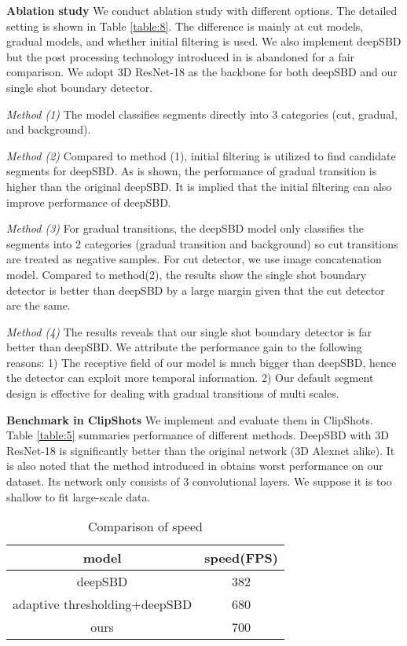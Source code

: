 \documentclass[runningheads]{llncs}
\begin{document}
\textbf{Ablation study} We conduct ablation study with different options. The detailed setting is shown in Table \ref{table:8}. The difference is mainly at cut models, gradual models, and whether initial filtering is used. We also implement deepSBD but the post processing technology introduced in \cite{hassanien2017large} is abandoned for a fair comparison. We adopt 3D ResNet-18 as the backbone for both deepSBD and our single shot boundary detector. 

\textit{Method (1)} The model classifies segments directly into 3 categories (cut, gradual, and background).

\textit{Method (2)} Compared to method (1), initial filtering is utilized to find candidate segments for deepSBD. As is shown, the performance of gradual transition is higher than the original deepSBD. It is implied that the initial filtering can also improve performance of deepSBD.

\textit{Method (3)} For gradual transitions, the deepSBD model only classifies the segments into 2 categories (gradual transition and background) so cut transitions are treated as negative samples. For cut detector, we use image concatenation model. Compared to method(2), the results show the single shot boundary detector is better than deepSBD by a large margin given that the cut detector are the same.

\textit{Method (4)} The results reveals that our single shot boundary detector is far better than deepSBD. We attribute the performance gain to the following reasons: 1) The receptive field of our model is much bigger than deepSBD, hence the detector can exploit more temporal information. 2) Our default segment design is effective for dealing with gradual transitions of multi scales.

\textbf{Benchmark in ClipShots}
We implement \cite{hassanien2017large,gygli2017ridiculously} and evaluate them in ClipShots. Table \ref{table:5} summaries performance of different methods. DeepSBD with 3D ResNet-18 is significantly better than the original network (3D Alexnet alike). It is also noted that the method introduced in \cite{gygli2017ridiculously} obtains worst performance on our dataset. Its network only consists of 3 convolutional layers. We suppose it is too shallow to fit large-scale data. 

\begin{table}
\centering
\begin{tabular} {c|c}
\hline model&speed(FPS)\\
\hline deepSBD&382\\
\hline adaptive thresholding+deepSBD&680\\
\hline ours&700\\
\hline
\end{tabular}
\caption[Comparison of cut models]{Comparison of speed}\label{table:speed}
\end{table}
\end{document}
